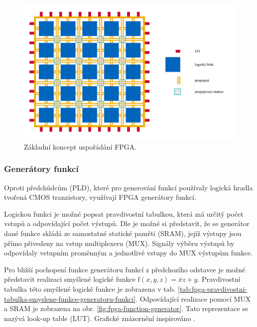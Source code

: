 \documentclass[a4paper, twoside, 11pt]{article}
\newcommand{\fbar}{\FloatBarrier}
\begin{document}
		\begin{figure}[htbp!]
			\centering
				\includegraphics[width=1\textwidth]{src/pdf/fpga-general-design.pdf} 
				\caption{Základní koncept uspořádání FPGA.}
				\label{fig:fpga-general-design}
		\end{figure}

		\fbar
		\subsubsection{Generátory funkcí}\label{subsubsec:generatory-funkci}
		Oproti předchůdcům (PLD), které pro generování funkcí používaly logická hradla tvořená CMOS tranzistory, využívají FPGA generátory funkcí.\par
		Logickou funkci je možné popsat pravdivostní tabulkou, která má určitý počet vstupů a odpovídající počet výstupů. Dle \cite{Sass2010} je možné si představit, že se generátor dané funkce skládá ze samostatné statické paměti (SRAM), jejíž výstupy jsou přímo přivedeny na vstup multiplexeru (MUX). Signály výběru výstupů by odpovídaly vstupním proměnným a jednotlivé vstupy do MUX výstupům funkce.\par
		Pro bližší pochopení funkce generátoru funkcí z předchozího odstavce je možné představit realizaci smyšlené logické funkce $\text{f} (x, y, z) = \bar{x}z + y$. Pravdivostní tabulka této smyšlené logické funkce je zobrazena v tab. \ref{tab:fpga-pravdivostni-tabulka-smyslene-funkce-generatoru-funkci}. Odpovídající realizace pomocí MUX a SRAM je zobrazena na obr. \ref{fig:fpga-function-generator}. Tato reprezentace se nazývá look-up table (LUT). Grafické znázornění inspirováno \cite{Sass2010}.
		
\end{document}
